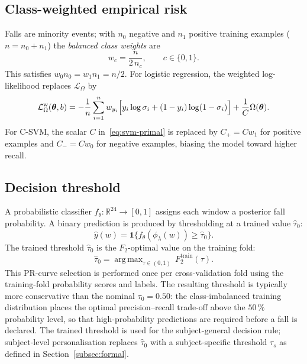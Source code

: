 \documentclass[onluarkali,ingilizce,yukseklisans,karton,LisansustuEgitim]{itutez}
\DeclareMathOperator*{\argmax}{arg\,max}
\providecommand{\R}{\mathbb{R}}
\providecommand{\1}{\mathbf{1}}
\begin{document}
\subsection{Class-weighted empirical risk}
\label{subsubsec:classweight}

Falls are minority events; with $n_0$ negative and $n_1$ positive training examples ($n=n_0+n_1$) the \emph{balanced class weights} are
\begin{equation}
  w_c=\frac{n}{2\,n_c},\qquad c\in\{0,1\}.
  \label{eq:cw}
\end{equation}
This satisfies $w_0n_0=w_1n_1=n/2$. For logistic regression, the weighted log-likelihood replaces $\mathcal{L}_\Omega$ by
\[
  \mathcal{L}_\Omega^{\mathrm{w}}(\boldsymbol\theta,b)
  =-\frac{1}{n}\sum_{i=1}^n w_{y_i}\Bigl[y_i\log\sigma_i+(1-y_i)\log(1-\sigma_i)\Bigr]
  +\frac{1}{C}\Omega(\boldsymbol\theta).
\]
For C-SVM, the scalar $C$ in~\eqref{eq:svm-primal} is replaced by $C_+=Cw_1$ for positive examples and $C_-=Cw_0$ for negative examples, biasing the model toward higher recall.

\subsection{Decision threshold}
\label{subsubsec:threshold}

A probabilistic classifier $f_\theta\colon\R^{24}\to[0,1]$ assigns each window a posterior fall probability. A binary prediction is produced by thresholding at a trained value $\hat\tau_0$:
\begin{equation}
  \widehat y(w)=\1\bigl\{f_\theta(\phi_\lambda(w))\geq\hat\tau_0\bigr\}.
  \label{eq:dec-thresh}
\end{equation}
The trained threshold $\hat\tau_0$ is the $F_2$-optimal value on the training fold:
\[
  \hat\tau_0 = \argmax_{\tau\in(0,1)}\,F_2^{\mathrm{train}}(\tau).
\]
This PR-curve selection is performed once per cross-validation fold using the training-fold probability scores and labels. The resulting threshold is typically more conservative than the nominal $\tau_0=0.50$: the class-imbalanced training distribution places the optimal precision--recall trade-off above the $50\,\%$ probability level, so that high-probability predictions are required before a fall is declared. The trained threshold is used for the subject-general decision rule; subject-level personalisation replaces $\hat\tau_0$ with a subject-specific threshold $\tau_s$ as defined in Section~\ref{subsec:formal}.

\end{document}
